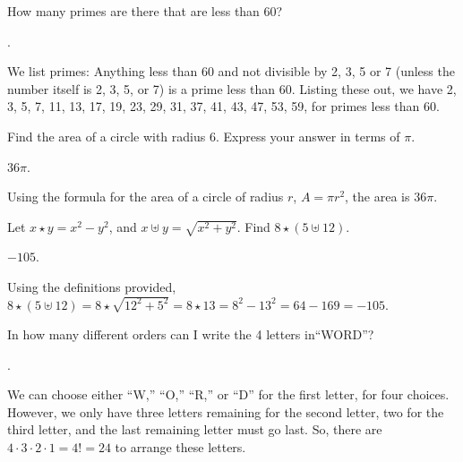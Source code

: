 \documentclass[11pt]{article}
\begin{document}

\begin{problem}How many primes are there that are less than 60?
\end{problem}

\begin{answer} . \end{answer}
\begin{solution}
We list primes: Anything less than 60 and not divisible by 2, 3, 5 or 7 (unless the number itself is 2, 3, 5, or 7) is a prime less than 60. Listing these out, we have 2, 3, 5, 7, 11, 13, 17, 19, 23, 29, 31, 37, 41, 43, 47, 53, 59, for  primes less than 60.
\end{solution}

\begin{problem}Find the area of a circle with radius 6. Express your answer in terms of $\pi$.
\end{problem}

\begin{answer} $\boxed{36\pi}$. \end{answer}
\begin{solution}
Using the formula for the area of a circle of radius $r$, $A = \pi r^2$, the area is $\boxed{36 \pi}$.
\end{solution}

\begin{problem} Let $x \star y = x^2 - y^2$, and $x \uplus y = \sqrt{x^2 + y^2}$. Find $8 \star (5 \uplus 12)$.
\end{problem}

\begin{answer} $\boxed{-105}$. \end{answer}
\begin{solution}
Using the definitions provided, $8 \star (5 \uplus 12) = 8 \star \sqrt{12^2 + 5^2} = 8 \star 13 = 8^2 - 13^2 = 64 - 169 = \boxed{-105}.$
\end{solution}

\begin{problem}In how many different orders can I write the 4 letters in``WORD''?
\end{problem}

\begin{answer} . \end{answer}
\begin{solution}
We can choose either ``W,'' ``O,'' ``R,'' or ``D'' for the first letter, for four choices. However, we only have three letters remaining for the second letter, two for the third letter, and the last remaining letter must go last. So, there are $4 \cdot 3 \cdot 2 \cdot 1 = 4! = \boxed{24}$ to arrange these letters.
\end{solution}
\end{document}
